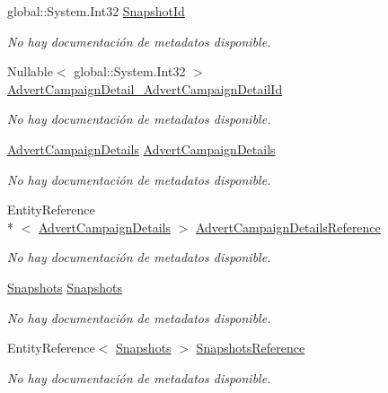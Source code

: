\begin{DoxyCompactItemize}
global\-::\-System.\-Int32 \hyperlink{class_game_memory_1_1_interactions_a59c14fd2a2ca950b68bed7cfb6f34204}{Snapshot\-Id}
\begin{DoxyCompactList}\small\item\em No hay documentación de metadatos disponible. \end{DoxyCompactList}\item 
Nullable$<$ global\-::\-System.\-Int32 $>$ \hyperlink{class_game_memory_1_1_interactions_ab8a00140ce65784deb9c0daa8a4d9660}{Advert\-Campaign\-Detail\-\_\-\-Advert\-Campaign\-Detail\-Id}
\begin{DoxyCompactList}\small\item\em No hay documentación de metadatos disponible. \end{DoxyCompactList}\item 
\hyperlink{class_game_memory_1_1_advert_campaign_details}{Advert\-Campaign\-Details} \hyperlink{class_game_memory_1_1_interactions_a9e244f239f3288b61c5f0defb86e7f61}{Advert\-Campaign\-Details}
\begin{DoxyCompactList}\small\item\em No hay documentación de metadatos disponible. \end{DoxyCompactList}\item 
Entity\-Reference\\*
$<$ \hyperlink{class_game_memory_1_1_advert_campaign_details}{Advert\-Campaign\-Details} $>$ \hyperlink{class_game_memory_1_1_interactions_ac6192a75df8c0e97efa2f04150e31f7e}{Advert\-Campaign\-Details\-Reference}
\begin{DoxyCompactList}\small\item\em No hay documentación de metadatos disponible. \end{DoxyCompactList}\item 
\hyperlink{class_game_memory_1_1_snapshots}{Snapshots} \hyperlink{class_game_memory_1_1_interactions_ae86dcc6c95cb31539a33d54cefe4f88d}{Snapshots}
\begin{DoxyCompactList}\small\item\em No hay documentación de metadatos disponible. \end{DoxyCompactList}\item 
Entity\-Reference$<$ \hyperlink{class_game_memory_1_1_snapshots}{Snapshots} $>$ \hyperlink{class_game_memory_1_1_interactions_a88dffca5092152fbe3917d1e3021a786}{Snapshots\-Reference}
\begin{DoxyCompactList}\small\item\em No hay documentación de metadatos disponible. \end{DoxyCompactList}\end{DoxyCompactItemize}



